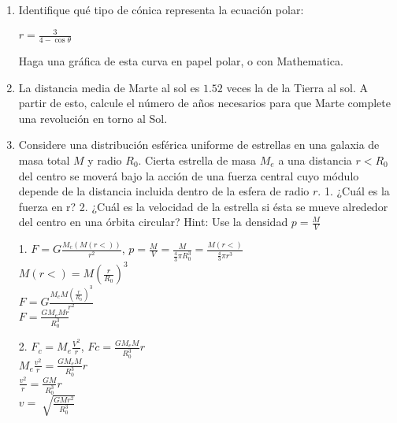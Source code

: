 \documentclass[10pt, a4paper]{article}
\begin{document}
\begin{enumerate}
        \item Identifique qué tipo de cónica representa la ecuación polar:
        \begin{center}
            $r=\frac{3}{4-\cos\theta}$
        \end{center}
        Haga una gráfica de esta curva en papel polar, o con Mathematica.

        \item La distancia media de Marte al sol es $1.52$ veces la de la Tierra al sol.
        A partir de esto, calcule el número de años necesarios para que Marte
        complete una revolución en torno al Sol.

        \item Considere una distribución esférica uniforme de estrellas en una galaxia
        de masa total $M$ y radio $R_0$. Cierta estrella de masa $M_e$ a una distancia
        $r < R_0$ del centro se moverá bajo la acción de una fuerza central cuyo
        módulo depende de la distancia incluida dentro de la esfera de radio $r$. 1.
        ¿Cuál es la fuerza en r? 2. ¿Cuál es la velocidad de la estrella si ésta se
        mueve alrededor del centro en una órbita circular? Hint: Use la densidad $p=\frac{M}{V}$

        \begin{center}

            1. $F=G\frac{M_e (M(r<))}{r^2}$, $p=\frac{M}{V}=\frac{M}{\frac{4}{3}\pi R_0^3}=\frac{M(r<)}{\frac{4}{3}\pi r^3}$\\ 
            $M(r<)=M(\frac{r}{R_0})^3$\\
            $F=G\frac{M_e M(\frac{r}{R_0})^3}{r^2}$\\
            $F=\frac{G M_e M r}{R_0^3}$

            2. $F_c=M_e\frac{V^2}{r}$, $Fc=\frac{G M_e M}{R_0^3}r$\\
            $M_e\frac{v^2}{r}=\frac{G M_e M}{R_0^3}r$\\
            $\frac{v^2}{r}=\frac{G M}{R_0^3}r$\\
            $v=\sqrt[]{\frac{GMr^2}{R_0^3}}$

        \end{center}
    \end{enumerate}
\end{document}
